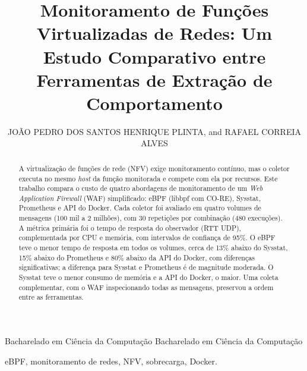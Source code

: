 \documentclass{ieeeaccess}
\begin{document}
\newlength{\xfigwd}  %
\setlength{\xfigwd}{\columnwidth}


\title{Monitoramento de Funções Virtualizadas de Redes: Um Estudo Comparativo entre Ferramentas de Extração de Comportamento}

\author{
\uppercase{João Pedro dos Santos Henrique Plinta}, and
\uppercase{Rafael Correia Alves}}

\address[1]{Orientador: Prof. Guilherme Werneck de Oliveira}

\markboth
{Bacharelado em Ciência da Computação}
{Bacharelado em Ciência da Computação}


\begin{abstract}
A virtualização de funções de rede (NFV) exige monitoramento contínuo, mas o coletor executa no mesmo \textit{host} da função monitorada e compete com ela por recursos. Este trabalho compara o custo de quatro abordagens de monitoramento de um \textit{Web Application Firewall} (WAF) simplificado: eBPF (libbpf com CO-RE), Sysstat, Prometheus e API do Docker. Cada coletor foi avaliado em quatro volumes de mensagens (100 mil a 2 milhões), com 30 repetições por combinação (480 execuções). A métrica primária foi o tempo de resposta do observador (RTT UDP), complementada por CPU e memória, com intervalos de confiança de 95\%. O eBPF teve o menor tempo de resposta em todos os volumes, cerca de 13\% abaixo do Sysstat, 15\% abaixo do Prometheus e 80\% abaixo da API do Docker, com diferenças significativas; a diferença para Sysstat e Prometheus é de magnitude moderada. O Sysstat teve o menor consumo de memória e a API do Docker, o maior. Uma coleta complementar, com o WAF inspecionando todas as mensagens, preservou a ordem entre as ferramentas.
\end{abstract}

\begin{keywords}
eBPF, monitoramento de redes, NFV, sobrecarga, Docker.
\end{keywords}

\titlepgskip=-15pt

\maketitle
\end{document}
